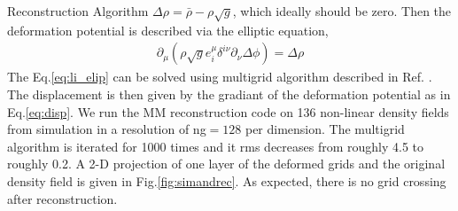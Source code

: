 \begin{section}{Reconstruction Algorithm}
$\Delta \rho = \bar{\rho}-\rho \sqrt{g}$, which ideally should be zero. Then the 
deformation potential is described via the elliptic equation,
\begin{align}
 \label{eq:li_elip}
    \partial _\mu (\rho \sqrt{g} e^\mu _i \delta^{i\nu}\partial_\nu \Delta \phi)=\Delta \rho
\end{align}
The Eq.\ref{eq:li_elip} can be solved using multigrid algorithm described in Ref. 
\cite{bib:Pen1995,bib:Pen1998}. The displacement is then given by the gradiant of the deformation 
potential as in Eq.\ref{eq:disp}. We run the MM reconstruction code on 136 non-linear density fields from simulation 
in a resolution of ng$=128$ per dimension. The multigrid algorithm is iterated for 1000 times and it rms 
decreases from roughly 4.5 to roughly 0.2. 
A 2-D projection of one layer of the deformed grids and the 
original density field is given in Fig.\ref{fig:simandrec}. 
As expected, there is no grid crossing after reconstruction.
%
\end{section}

